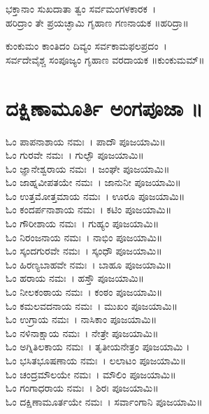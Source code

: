 ಭಕ್ತಾನಾಂ ಸುಖದಾತಾ ತ್ವಂ ಸರ್ವಮಂಗಳಕಾರಕ~।\\
ಹರಿದ್ರಾಂ ತೇ ಪ್ರಯಚ್ಛಾಮಿ ಗೃಹಾಣ ಗಣನಾಯಕ ॥ಹರಿದ್ರಾ॥

ಕುಂಕುಮಂ ಕಾಂತಿದಂ ದಿವ್ಯಂ ಸರ್ವಕಾಮಫಲಪ್ರದಂ~।\\
ಸರ್ವದೇವೈಶ್ಚ ಸಂಪೂಜ್ಯಂ ಗೃಹಾಣ ವರದಾಯಕ ॥ಕುಂಕುಮಮ್॥

\section{ದಕ್ಷಿಣಾಮೂರ್ತಿ ಅಂಗಪೂಜಾ ॥}
ಓಂ ಪಾಪನಾಶಾಯ ನಮಃ~। ಪಾದೌ ಪೂಜಯಾಮಿ॥\\
ಓಂ ಗುರವೇ ನಮಃ~। ಗುಲ್ಫೌ ಪೂಜಯಾಮಿ॥\\
ಓಂ ಜ್ಞಾನೇಶ್ವರಾಯ ನಮಃ~। ಜಂಘೇ ಪೂಜಯಾಮಿ॥\\
ಓಂ ಜಾಹ್ನವೀಪತಯೇ ನಮಃ~। ಜಾನುನೀ ಪೂಜಯಾಮಿ॥\\
ಓಂ ಉತ್ತಮೋತ್ತಮಾಯ ನಮಃ~। ಊರೂ ಪೂಜಯಾಮಿ॥\\
ಓಂ ಕಂದರ್ಪನಾಶಾಯ ನಮಃ~। ಕಟಿಂ ಪೂಜಯಾಮಿ॥\\
ಓಂ ಗೌರೀಶಾಯ ನಮಃ~। ಗುಹ್ಯಂ ಪೂಜಯಾಮಿ॥\\
ಓಂ ನಿರಂಜನಾಯ ನಮಃ~। ನಾಭಿಂ ಪೂಜಯಾಮಿ॥\\
ಓಂ ಸ್ಕಂದಗುರವೇ ನಮಃ~। ಸ್ಕಂಧೌ ಪೂಜಯಾಮಿ॥\\
ಓಂ ಹಿರಣ್ಯಬಾಹವೇ ನಮಃ~। ಬಾಹೂ ಪೂಜಯಾಮಿ॥\\
ಓಂ ಹರಾಯ ನಮಃ~। ಹಸ್ತೌ ಪೂಜಯಾಮಿ॥\\
ಓಂ ನೀಲಕಂಠಾಯ ನಮಃ~। ಕಂಠಂ ಪೂಜಯಾಮಿ॥\\
ಓಂ ಕಮಲವದನಾಯ ನಮಃ~। ಮುಖಂ ಪೂಜಯಾಮಿ॥\\
ಓಂ ಉಗ್ರಾಯ ನಮಃ~। ನಾಸಿಕಾಂ ಪೂಜಯಾಮಿ॥\\
ಓಂ ನಳಿನಾಕ್ಷಾಯ ನಮಃ~। ನೇತ್ರೇ ಪೂಜಯಾಮಿ॥\\
ಓಂ ಅಗ್ನಿತಿಲಕಾಯ ನಮಃ~। ತೃತೀಯನೇತ್ರಂ ಪೂಜಯಾಮಿ ।\\
ಓಂ ಭಸಿತಭೂಷಣಾಯ ನಮಃ~। ಲಲಾಟಂ ಪೂಜಯಾಮಿ॥\\
ಓಂ ಚಂದ್ರಮೌಲಯೇ ನಮಃ~। ಮೌಲಿಂ ಪೂಜಯಾಮಿ॥\\
ಓಂ ಗಂಗಾಧರಾಯ ನಮಃ~। ಶಿರಃ ಪೂಜಯಾಮಿ॥\\
ಓಂ ದಕ್ಷಿಣಾಮೂರ್ತಯೇ ನಮಃ~। ಸರ್ವಾಂಗಾನಿ ಪೂಜಯಾಮಿ॥
